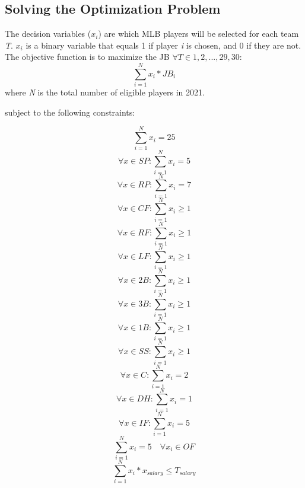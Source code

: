 \documentclass{article}
\begin{document}
\subsection{Solving the Optimization Problem}

The decision variables ($x_{i}$) are which MLB players will be selected for each team \emph{T}. $x_{i}$ is a binary variable that equals 1 if player \emph{i} is chosen, and 0 if they are not. The objective function is to maximize the JB $\forall T \in {1, 2, ..., 29, 30}$:
\begin{equation}
\sum_{i = 1}^{N} x_{i} * JB_{i}
\end{equation} where \emph{N} is the total number of eligible players in 2021.

subject to the following constraints:

\begin{equation}
\sum_{i = 1}^{N} x_{i} = 25
\end{equation}
\begin{equation}
\forall x \in SP:  \sum_{i = 1}^{N} x_{i} = 5
\end{equation}
\begin{equation}
\forall x \in RP:  \sum_{i = 1}^{N} x_{i} = 7 
\end{equation}
\begin{equation} 
\forall x \in CF:  \sum_{i = 1}^{N} x_{i} \geq 1
\end{equation}
\begin{equation} 
\forall x \in RF:  \sum_{i = 1}^{N} x_{i} \geq 1 
\end{equation}
\begin{equation} 
\forall x \in LF:  \sum_{i = 1}^{N} x_{i} \geq 1 
\end{equation}
\begin{equation} 
\forall x \in 2B:  \sum_{i = 1}^{N} x_{i} \geq 1 
\end{equation}
\begin{equation} 
\forall x \in 3B:  \sum_{i = 1}^{N} x_{i} \geq 1
\end{equation} 
\begin{equation} 
\forall x \in 1B:  \sum_{i = 1}^{N} x_{i} \geq 1 
\end{equation}
\begin{equation} 
\forall x \in SS:  \sum_{i = 1}^{N} x_{i} \geq 1 
\end{equation}
\begin{equation} 
\forall x \in C:  \sum_{i = 1}^{N} x_{i} = 2 
\end{equation}
\begin{equation}
\forall x \in DH:  \sum_{i = 1}^{N} x_{i} = 1 
\end{equation}
\begin{equation} 
\forall x \in IF:  \sum_{i = 1}^{N} x_{i} = 5 
\end{equation}
\begin{equation} 
\sum_{i = 1}^{N} x_{i}  = 5 \quad \forall x_i \in OF 
\end{equation}
\begin{equation}
\sum_{i = 1}^{N} x_{i} * x_{salary} \leq T_{salary}
\end{equation}
\end{document}

